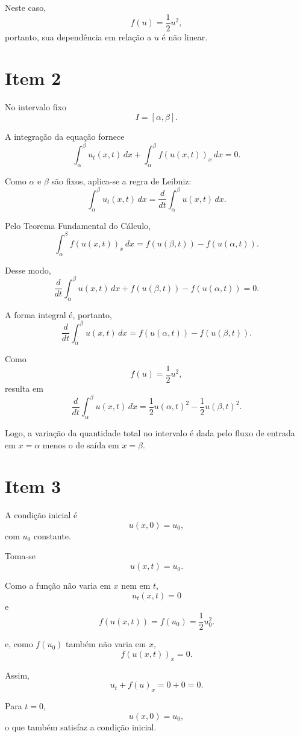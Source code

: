 \documentclass[
    12pt,
    oneside,
    a4paper,
    english,
    brazilian,
    chapter=TITLE,
    sumario=tradicional
]{abntex2}
\begin{document}
Neste caso,
\[
    f(u)=\frac{1}{2}u^2,
\]
portanto, sua dependência em relação a $u$ é não linear.

\section{Item 2}

No intervalo fixo
\[
    I=[\alpha,\beta].
\]

A integração da equação fornece
\[
    \int_{\alpha}^{\beta}u_t(x,t)\,dx
    +
    \int_{\alpha}^{\beta}f(u(x,t))_x\,dx
    =
    0.
\]

Como $\alpha$ e $\beta$ são fixos, aplica-se a regra de Leibniz:
\[
    \int_{\alpha}^{\beta}u_t(x,t)\,dx
    =
    \frac{d}{dt}
    \int_{\alpha}^{\beta}u(x,t)\,dx.
\]

Pelo Teorema Fundamental do Cálculo,
\[
    \int_{\alpha}^{\beta}f(u(x,t))_x\,dx
    =
    f(u(\beta,t))-f(u(\alpha,t)).
\]

Desse modo,
\[
    \frac{d}{dt}
    \int_{\alpha}^{\beta}u(x,t)\,dx
    +
    f(u(\beta,t))
    -
    f(u(\alpha,t))
    =
    0.
\]

A forma integral é, portanto,
\[
    \boxed{
        \frac{d}{dt}
        \int_{\alpha}^{\beta}u(x,t)\,dx
        =
        f(u(\alpha,t))-f(u(\beta,t))
    }.
\]

Como
\[
    f(u)=\frac{1}{2}u^2,
\]
resulta em
\[
    \boxed{
        \frac{d}{dt}
        \int_{\alpha}^{\beta}u(x,t)\,dx
        =
        \frac{1}{2}u(\alpha,t)^2
        -
        \frac{1}{2}u(\beta,t)^2
    }.
\]

Logo, a variação da quantidade total no intervalo é dada pelo fluxo de entrada
em $x=\alpha$ menos o de saída em $x=\beta$.

\section{Item 3}

A condição inicial é
\[
    u(x,0)=u_0,
\]
com $u_0$ constante.

Toma-se
\[
    u(x,t)=u_0.
\]

Como a função não varia em $x$ nem em $t$,
\[
    u_t(x,t)=0
\]
e
\[
    f(u(x,t))
    =
    f(u_0)
    =
    \frac{1}{2}u_0^2.
\]

e, como $f(u_0)$ também não varia em $x$,
\[
    f(u(x,t))_x=0.
\]

Assim,
\[
    u_t+f(u)_x=0+0=0.
\]

Para $t=0$,
\[
    u(x,0)=u_0,
\]
o que também satisfaz a condição inicial.
\end{document}
